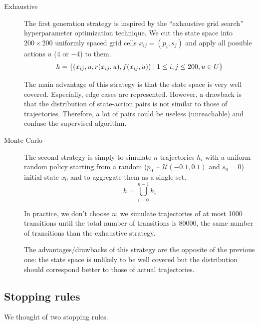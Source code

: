 \documentclass[a4paper, 12pt]{article}
\begin{document}
    \begin{description}
        \item[Exhaustive] The first generation strategy is inspired by the \enquote{exhaustive grid search} hyperparameter optimization technique. We cut the state space into $200 \times 200$ uniformly spaced grid cells $x_{ij} = (p_i, s_j)$ and apply all possible actions $u$ (\num{+4} or \num{-4}) to them.
        \begin{equation}
            h = \left\{\left(x_{ij}, u, r(x_{ij}, u), f(x_{ij}, u)\right) \mid 1 \leq i, j \leq 200, u \in U\right\}
        \end{equation}
        
        The main advantage of this strategy is that the state space is very well covered. Especially, edge cases are represented. However, a drawback is that the distribution of state-action pairs is not similar to those of trajectories. Therefore, a lot of pairs could be useless (unreachable) and confuse the supervised algorithm.
        
        \item[Monte Carlo] The second strategy is simply to simulate $n$ trajectories $h_i$ with a uniform random policy starting from a random ($p_0 \sim \mathcal{U}(\num{-0.1}, \num{0.1})$ and $s_0 = 0$) initial state $x_0$ and to aggregate them as a single set.
        \begin{equation}
            h = \bigcup_{i=0}^{n - 1} h_i
        \end{equation}
        
        In practice, we don't choose $n$; we simulate trajectories of at most \num{1000} transitions until the total number of transitions is \num{80000}, \ie{} the same number of transitions than the exhaustive strategy.
        
        The advantages/drawbacks of this strategy are the opposite of the previous one: the state space is unlikely to be well covered but the distribution should correspond better to those of actual trajectories.        
    \end{description}
    
    \subsection{Stopping rules}\label{sec:stopping.rules}
    
    We thought of two stopping rules.
    
\end{document}
